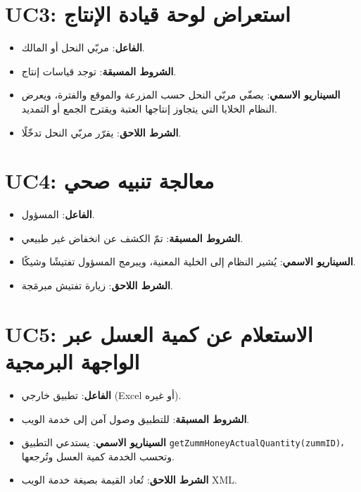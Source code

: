 \section{UC3: استعراض لوحة قيادة الإنتاج}
\begin{itemize}
  \item \textbf{الفاعل}: مربّي النحل أو المالك.
  \item \textbf{الشروط المسبقة}: توجد قياسات إنتاج.
  \item \textbf{السيناريو الاسمي}: يصفّي مربّي النحل حسب المزرعة والموقع والفترة، ويعرض النظام الخلايا التي يتجاوز إنتاجها العتبة ويقترح الجمع أو التمديد.
  \item \textbf{الشرط اللاحق}: يقرّر مربّي النحل تدخّلًا.
\end{itemize}

\section{UC4: معالجة تنبيه صحي}
\begin{itemize}
  \item \textbf{الفاعل}: المسؤول.
  \item \textbf{الشروط المسبقة}: تمّ الكشف عن انخفاض غير طبيعي.
  \item \textbf{السيناريو الاسمي}: يُشير النظام إلى الخلية المعنية، ويبرمج المسؤول تفتيشًا وشيكًا.
  \item \textbf{الشرط اللاحق}: زيارة تفتيش مبرمَجة.
\end{itemize}

\section{UC5: الاستعلام عن كمية العسل عبر الواجهة البرمجية}
\begin{itemize}
  \item \textbf{الفاعل}: تطبيق خارجي (\textenglish{Excel} أو غيره).
  \item \textbf{الشروط المسبقة}: للتطبيق وصول آمن إلى خدمة الويب.
  \item \textbf{السيناريو الاسمي}: يستدعي التطبيق \texttt{getZummHoneyActualQuantity(zummID)}، وتحسب الخدمة كمية العسل وتُرجعها.
  \item \textbf{الشرط اللاحق}: تُعاد القيمة بصيغة خدمة الويب \textenglish{XML}.
\end{itemize}

